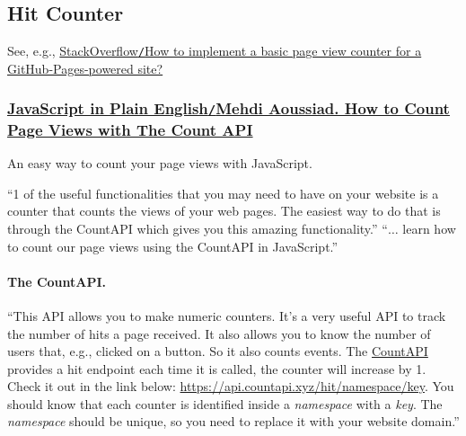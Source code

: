 \documentclass{article}
\numberwithin{equation}{section}
\begin{document}
\subsection{Hit Counter}
See, e.g., \href{https://stackoverflow.com/questions/57747640/how-to-implement-a-basic-page-view-counter-for-a-github-pages-powered-site}{StackOverflow\texttt{/}How to implement a basic page view counter for a GitHub-Pages-powered site?}

\subsubsection{\href{https://javascript.plainenglish.io/how-to-count-page-views-with-the-count-api-afc9369c1f8f}{JavaScript in Plain English\texttt{/}Mehdi Aoussiad. How to Count Page Views with The Count API}}

\begin{flushright}
	An easy way to count your page views with JavaScript.
\end{flushright}
``1 of the useful functionalities that you may need to have on your website is a counter that counts the views of your web pages. The easiest way to do that is through the CountAPI which gives you this amazing functionality.'' ``$\ldots$ learn how to count our page views using the CountAPI in JavaScript.''

\paragraph{The CountAPI.} ``This API allows you to make numeric counters. It's a very useful API to track the number of hits a page received. It also allows you to know the number of users that, e.g., clicked on a button. So it also counts events. The \href{https://countapi.xyz/}{CountAPI} provides a hit endpoint each time it is called, the counter will increase by 1. Check it out in the link below: \url{https://api.countapi.xyz/hit/namespace/key}. You should know that each counter is identified inside a \textit{namespace} with a \textit{key}. The \textit{namespace} should be unique, so you need to replace it with your website domain.''
\end{document}
